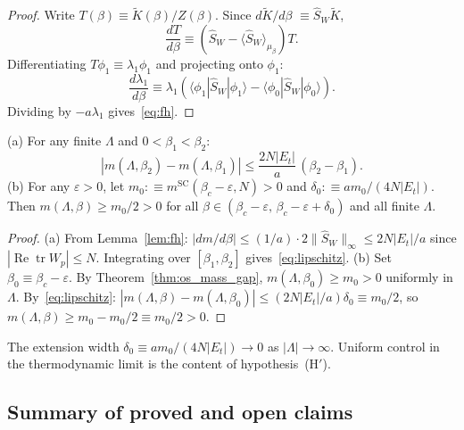 \begin{proof}
Write $T(\beta)\equiv\tilde{K}(\beta)/Z(\beta)$.
Since $d\tilde{K}/d\beta$ $\equiv\hat{S}_W\tilde{K}$,
\[
  \frac{dT}{d\beta}
  \equiv(\hat{S}_W-\langle\hat{S}_W\rangle_{\mu_\beta})T.
\]
Differentiating $T\phi_1\equiv\lambda_1\phi_1$ and projecting onto $\phi_1$:
\[
  \frac{d\lambda_1}{d\beta}
  \equiv\lambda_1(\langle\phi_1|\hat{S}_W|\phi_1\rangle
  -\langle\phi_0|\hat{S}_W|\phi_0\rangle).
\]
Dividing by $-a\lambda_1$ gives~\eqref{eq:fh}.
\end{proof}

\begin{theorem}
\label{thm:lipschitz_extension}
\textup{(a)} For any finite $\Lambda$ and $0<\beta_1<\beta_2$:
\begin{equation}
\label{eq:lipschitz}
  |m(\Lambda,\beta_2)-m(\Lambda,\beta_1)|
  \le\frac{2N|E_t|}{a}\,(\beta_2-\beta_1).
\end{equation}
\textup{(b)} For any $\varepsilon>0$, let
$m_0:\equiv m^{\mathrm{SC}}(\beta_c-\varepsilon,N)>0$ and
$\delta_0:\equiv am_0/(4N|E_t|)$. Then
$m(\Lambda,\beta)\ge m_0/2>0$ for all
$\beta\in(\beta_c-\varepsilon,\,\beta_c-\varepsilon+\delta_0)$
and all finite $\Lambda$.
\end{theorem}

\begin{proof}
\textup{(a)} From Lemma~\ref{lem:fh}:
$|dm/d\beta|\le(1/a)\cdot 2\|\hat{S}_W\|_\infty\le 2N|E_t|/a$
since $|\operatorname{Re}\operatorname{tr}W_p|\le N$.
Integrating over $[\beta_1,\beta_2]$ gives~\eqref{eq:lipschitz}.
\textup{(b)} Set $\beta_0\equiv\beta_c-\varepsilon$.
By Theorem~\ref{thm:os_mass_gap},
$m(\Lambda,\beta_0)\ge m_0>0$ uniformly in $\Lambda$.
By~\eqref{eq:lipschitz}:
$|m(\Lambda,\beta)-m(\Lambda,\beta_0)|\le(2N|E_t|/a)\delta_0\equiv m_0/2$,
so $m(\Lambda,\beta)\ge m_0-m_0/2\equiv m_0/2>0$.
\end{proof}

\begin{remark}
\label{rem:lipschitz_limit}
The extension width $\delta_0\equiv am_0/(4N|E_t|)\to 0$ as $|\Lambda|\to\infty$.
Uniform control in the thermodynamic limit is the content of hypothesis~(H$'$).
\end{remark}
\subsection{Summary of proved and open claims}
\label{ssec:ext_summary}

